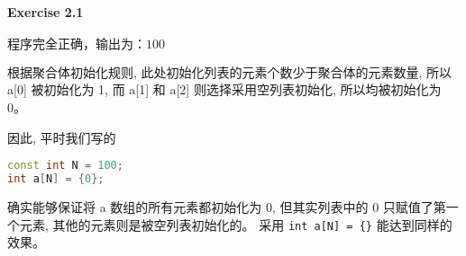 \documentclass{article}
\begin{document}
	\paragraph*{Exercise 2.1} $\boxed{\text{程序完全正确，输出为：100}} $
	
	根据聚合体初始化规则, 此处初始化列表的元素个数少于聚合体的元素数量, 所以 a[0] 被初始化为 1, 而 a[1] 和 a[2] 则选择采用空列表初始化, 所以均被初始化为 0。
	
	因此, 平时我们写的

	\begin{lstlisting}[language=C++]
const int N = 100;
int a[N] = {0};
	\end{lstlisting}

	确实能够保证将 a 数组的所有元素都初始化为 0, 但其实列表中的 0 只赋值了第一个元素, 其他的元素则是被空列表初始化的。
	采用 \verb|int a[N] = {}| 能达到同样的效果。
	 
\end{document}
